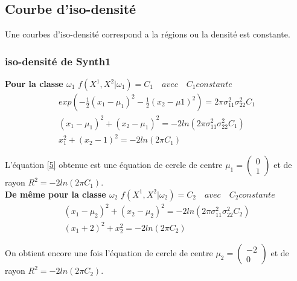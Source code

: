 \documentclass[10pt]{article}
\begin{document}
\subsection{Courbe d'iso-densité}
Une courbes d'iso-densité correspond a la régions ou la densité est constante.

\subsubsection{iso-densité de Synth1}
\textbf{Pour la classe $\omega_{1}$} $f(X^{1}, X^{2}|\omega_{1}) = C_{1} \quad avec \quad C_{1} constante$
\begin{equation}
\begin{split}
exp(-\frac{1}{2} (x_{1}-\mu_{1})^{2} - \frac{1}{2}(x_{2} - \mu{1})^{2})  = 2 \pi \sigma_{11}^{2} \sigma_{22}^{2} C_{1}
\\
(x_{1} - \mu_{1})^{2} + (x_{2} - \mu_{1})^{2} = -2ln(2 \pi \sigma_{11}^{2} \sigma_{22}^{2} C_{1})
\\
x_{1}^{2} + (x_{2} - 1)^{2} = -2 ln(2\pi C_{1})
\end{split}
\label{7}
\end{equation}

 L'équation \eqref{5} obtenue est une équation de cercle de centre $\mu_{1} = \begin{pmatrix} 0 \\ 1\end{pmatrix} $ et de rayon $R^{2} = -2 ln(2\pi C_{1})$.\\
 
 \textbf{De même pour la classe $\omega_{2}$} $f(X^{1}, X^{2}|\omega_{2}) = C_{2} \quad avec \quad C_{2} constante$
 \begin{equation}
 \begin{split}
 (x_{1} - \mu_{2})^{2} + (x_{2} - \mu_{2})^{2} = -2ln(2 \pi \sigma_{11}^{2} \sigma_{22}^{2}C_{2}) 
 \\
 (x_{1} + 2)^{2} + x_{2}^{2} = -2ln(2\pi C_{2})
 \label{8}
\end{split}
 \end{equation}
 
 On obtient encore une fois l'équation de cercle de centre $\mu_{2} = \begin{pmatrix} -2 \\ 0\end{pmatrix} $ et de rayon $R^{2} = -2 ln(2\pi C_{2})$.\\
\end{document}
